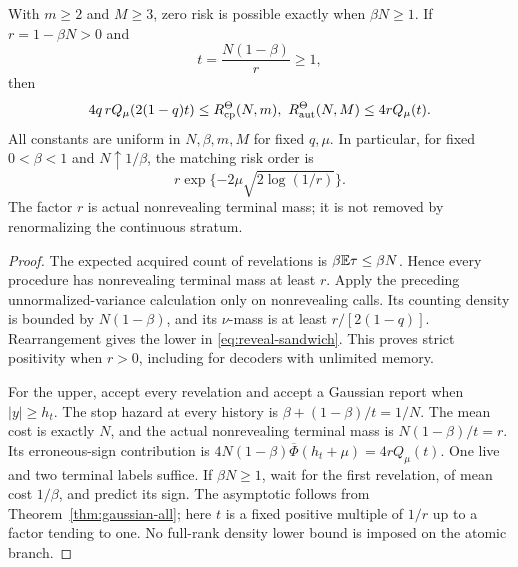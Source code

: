\begin{theorem}\label{thm:reveal}
With $m\ge2$ and $M\ge3$, zero risk is possible exactly when $\beta N\ge1$. If $r=1-\beta N>0$ and
\[
 t=\frac{N(1-\beta)}r\ge1,
\]
then
\begin{equation}\label{eq:reveal-sandwich}
 4q\,rQ_\mu(2(1-q)t)
 \le R_{\mathrm{cp}}^\Theta(N,m),\ R_{\mathrm{aut}}^\Theta(N,M)
 \le4rQ_\mu(t).
\end{equation}
All constants are uniform in $N,\beta,m,M$ for fixed $q,\mu$. In particular, for fixed $0<\beta<1$ and $N\uparrow1/\beta$, the matching risk order is
\[
 r\exp\{-2\mu\sqrt{2\log(1/r)}\}.
\]
The factor $r$ is actual nonrevealing terminal mass; it is not removed by renormalizing the continuous stratum.
\end{theorem}
\begin{proof}
The expected acquired count of revelations is $\beta\mathbb E\tau\le\beta N$. Hence every procedure has nonrevealing terminal mass at least $r$. Apply the preceding unnormalized-variance calculation only on nonrevealing calls. Its counting density is bounded by $N(1-\beta)$, and its $\nu$-mass is at least $r/[2(1-q)]$. Rearrangement gives the lower in \eqref{eq:reveal-sandwich}. This proves strict positivity when $r>0$, including for decoders with unlimited memory.

For the upper, accept every revelation and accept a Gaussian report when $|y|\ge h_t$. The stop hazard at every history is
$\beta+(1-\beta)/t=1/N$. The mean cost is exactly $N$, and the actual nonrevealing terminal mass is $N(1-\beta)/t=r$. Its erroneous-sign contribution is $4N(1-\beta)\overline\Phi(h_t+\mu)=4rQ_\mu(t)$. One live and two terminal labels suffice. If $\beta N\ge1$, wait for the first revelation, of mean cost $1/\beta$, and predict its sign. The asymptotic follows from Theorem~\ref{thm:gaussian-all}; here $t$ is a fixed positive multiple of $1/r$ up to a factor tending to one. No full-rank density lower bound is imposed on the atomic branch.
\end{proof}

